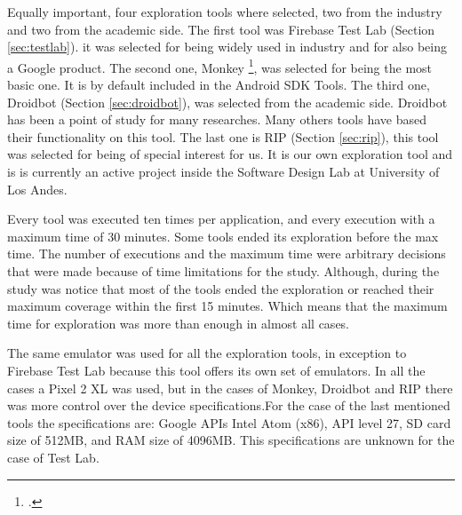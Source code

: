 Equally important, four exploration tools where selected, two from the industry and two from the academic side. The first tool was Firebase Test Lab (Section \ref{sec:testlab}). it was selected for being widely used in industry and for also being a Google product. The second one, Monkey \footcite{https://developer.android.com/studio/test/monkey}, was selected for being the most basic one. It is by default included in the Android SDK Tools. The third one, Droidbot (Section \ref{sec:droidbot}), was selected from the academic side. Droidbot has been a point of study for many researches. Many others tools have based their functionality on this tool. The last one is RIP (Section \ref{sec:rip}), this tool was selected for being of special interest for us. It is our own exploration tool and is is currently an active project inside the Software Design Lab at University of Los Andes. 

Every tool was executed ten times per application, and every execution with a maximum time of 30 minutes. Some tools ended its exploration before the max time. 
The number of executions and the maximum time were arbitrary decisions that were made because of time limitations for the study. Although, during the study was notice that most of the tools ended the exploration or reached their maximum coverage within the first 15 minutes. Which means that the maximum time for exploration was more than enough in almost all cases. 

The same emulator was used for all the exploration tools, in exception to Firebase Test Lab because this tool offers its own set of emulators. In all the cases a Pixel 2 XL was used, but in the cases of Monkey, Droidbot and RIP there was more control over the device specifications.For the case of the last mentioned tools the specifications are: Google APIs Intel Atom (x86), API level 27, SD card size of 512MB, and RAM size of 4096MB. This specifications are unknown for the case of Test Lab.

